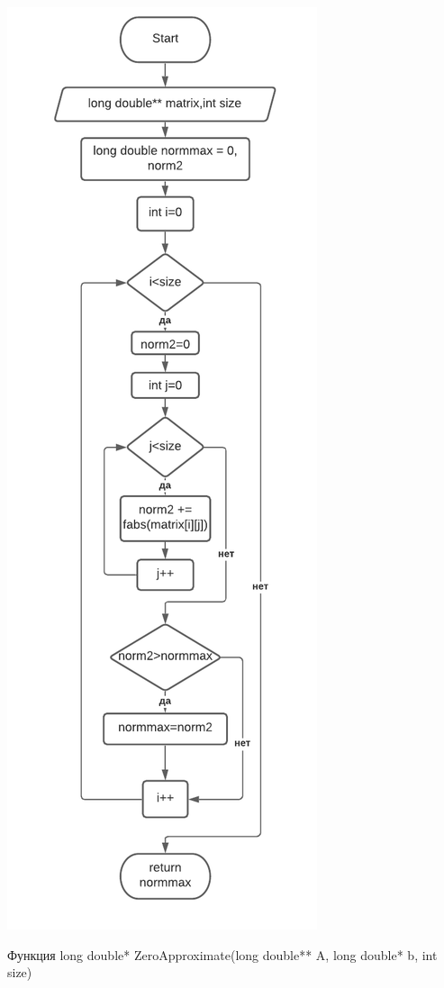 \includegraphics[scale=0.5]{block4.pdf}

Функция long double* ZeroApproximate(long double** A, long double* b, int size)

